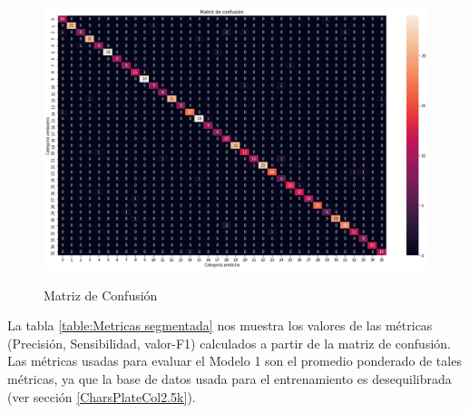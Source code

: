 \begin{figure}[H]
\centering
  {\includegraphics[width=0.7\linewidth]{imagenes/MODEL_CARACTERES_SEGMENTADOS/MATRIZ_CONFUSION.png}}
   \caption{Matriz de Confusión}
    \label{fig:matrizconfusion1}  
\end{figure}

La tabla \ref{table:Metricas segmentada} nos muestra los valores de las métricas (Precisión, Sensibilidad, valor-F1) calculados a partir de la matriz de confusión. Las métricas usadas para evaluar el Modelo 1 son el promedio ponderado de tales métricas, ya que la base de datos usada para el entrenamiento es desequilibrada (ver sección \ref{CharsPlateCol2.5k}). 

